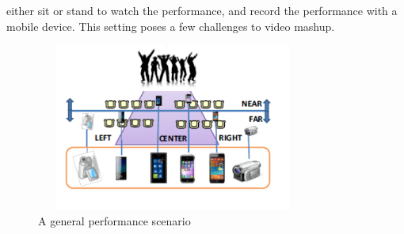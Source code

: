 \documentclass{sig-alternate}
\begin{document}
either sit or stand to watch the performance, and record the performance with a mobile device. This setting poses a few challenges to
video mashup.\\
\begin{figure}[h!]
  
  \includegraphics[width=9cm, height=5.5cm]{video_5.pdf}
\caption{A general performance scenario}
\end{figure}
\end{document}

